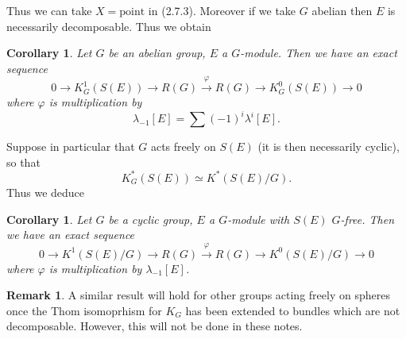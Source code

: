 \documentclass[leqno]{book}
\numberwithin{equation}{section}
\newtheorem{corollary}[theorem]{Corollary}
\theoremstyle{definition}
\newtheorem*{remark}{Remark}
\begin{document}
            Thus we can take $X=\text{point}$ in (2.7.3). Moreover if we take $G$ abelian then $E$ is necessarily decomposable. Thus we obtain

            \begin{corollary}
              Let $G$ be an abelian group, $E$ a $G$-module. Then we have an exact sequence
              \begin{equation*}
                0\to K_{G}^{1}(S(E))\to R(G)\stackrel{\varphi}{\rightarrow} R(G)\to K_{G}^{0}(S(E))\to 0
              \end{equation*}
              where $\varphi$ is multiplication by
              \begin{equation*}
                \lambda_{-1}[E]=\sum (-1)^{i}\lambda^{i}[E].
              \end{equation*}
            \end{corollary}

            Suppose in particular that $G$ acts freely on $S(E)$ (it is then necessarily cyclic), so that
            \begin{equation*}
              K^{*}_{G}(S(E))\simeq K^{*}(S(E)/G).
            \end{equation*}
            Thus we deduce
            
            \begin{corollary}
              Let $G$ be a cyclic group, $E$ a $G$-module with $S(E)$ $G$-free. Then we have an exact sequence
              \begin{equation*}
                0\to K^{1}(S(E)/G)\to R(G)\stackrel{\varphi}{\rightarrow} R(G)\to K^{0}(S(E)/G)\to 0
              \end{equation*}
              where $\varphi$ is multiplication by $\lambda_{-1}[E]$.
            \end{corollary}

            \begin{remark}
              A similar result will hold for other groups acting freely on spheres once the Thom isomoprhism for $K_{G}$ has been extended to bundles which are not decomposable. However, this will not be done in these notes.
            \end{remark}
\end{document}
